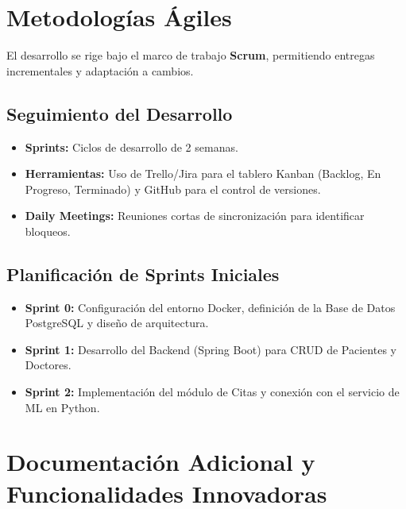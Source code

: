 \documentclass[12pt, a4paper]{article}
\begin{document}
	\section{Metodologías Ágiles}
	
	El desarrollo se rige bajo el marco de trabajo \textbf{Scrum}, permitiendo entregas incrementales y adaptación a cambios.
	
	\subsection{Seguimiento del Desarrollo}
	\begin{itemize}
		\item \textbf{Sprints:} Ciclos de desarrollo de 2 semanas.
		\item \textbf{Herramientas:} Uso de Trello/Jira para el tablero Kanban (Backlog, En Progreso, Terminado) y GitHub para el control de versiones.
		\item \textbf{Daily Meetings:} Reuniones cortas de sincronización para identificar bloqueos.
	\end{itemize}
	
	\subsection{Planificación de Sprints Iniciales}
	\begin{itemize}
		\item \textbf{Sprint 0:} Configuración del entorno Docker, definición de la Base de Datos PostgreSQL y diseño de arquitectura.
		\item \textbf{Sprint 1:} Desarrollo del Backend (Spring Boot) para CRUD de Pacientes y Doctores.
		\item \textbf{Sprint 2:} Implementación del módulo de Citas y conexión con el servicio de ML en Python.
	\end{itemize}
	
	\section{Documentación Adicional y Funcionalidades Innovadoras}
	
\end{document}
